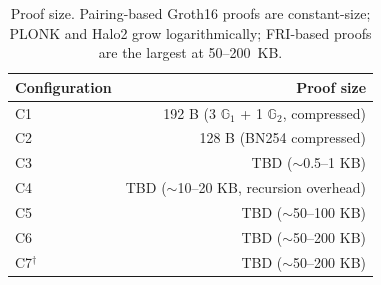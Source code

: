 \begin{table}[t]
  \centering
  \caption{Proof size. Pairing-based Groth16 proofs are constant-size;
    PLONK and Halo2 grow logarithmically; FRI-based proofs are the
    largest at 50--200~KB.}
  \label{tab:proof-size}
  \begin{tabular}{lr}
    \toprule
    Configuration & Proof size \\
    \midrule
    C1  & 192 B (3 $\mathbb{G}_1$ + 1 $\mathbb{G}_2$, compressed) \\
    C2  & 128 B (BN254 compressed) \\
    C3  & TBD ($\sim$0.5--1 KB) \\
    C4  & TBD ($\sim$10--20 KB, recursion overhead) \\
    C5  & TBD ($\sim$50--100 KB) \\
    C6  & TBD ($\sim$50--200 KB) \\
    C7$^\dagger$ & TBD ($\sim$50--200 KB) \\
    \bottomrule
  \end{tabular}
\end{table}

